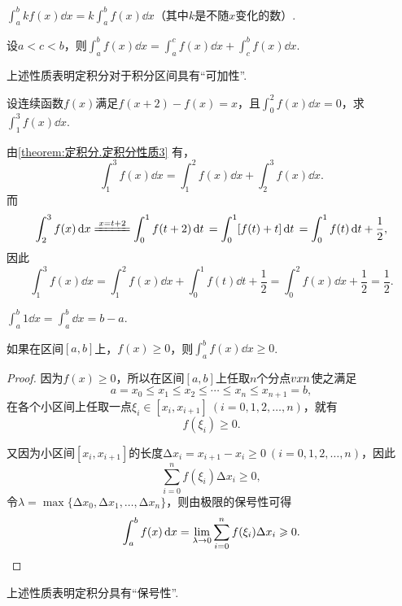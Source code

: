 \begin{property}\label{theorem:定积分.定积分性质2}
\(\int_a^b{kf(x)\dd{x}}=k\int_a^b f(x) \dd{x}\)（其中\(k\)是不随\(x\)变化的数）.
\end{property}

\begin{property}\label{theorem:定积分.定积分性质3}
设\(a < c < b\)，则\(\int_a^b f(x) \dd{x}
= \int_a^c{f(x)\dd{x}} + \int_c^b{f(x)\dd{x}}\).
\end{property}
上述性质表明定积分对于积分区间具有“可加性”.

\begin{example}
设连续函数\(f(x)\)满足\(f(x+2)-f(x)=x\)，且\(\int_0^2 f(x) \dd{x} = 0\)，求\(\int_1^3 f(x) \dd{x}\).
\begin{solution}
由\cref{theorem:定积分.定积分性质3} 有，\[
\int_1^3 f(x) \dd{x}
= \int_1^2 f(x) \dd{x}
+ \int_2^3 f(x) \dd{x}.
\]而\[
\int_2^3 f(x) \dd{x}
\xlongequal{x=t+2} \int_0^1 f(t+2) \dd{t} \\
= \int_0^1 [f(t) + t] \dd{t} \\
= \int_0^1 f(t) \dd{t} + \frac{1}{2},
\]因此\[
\int_1^3 f(x) \dd{x}
= \int_1^2 f(x) \dd{x}
+ \int_0^1 f(t) \dd{t} + \frac{1}{2}
= \int_0^2 f(x) \dd{x} + \frac{1}{2}
= \frac{1}{2}.
\]
\end{solution}
\end{example}

\begin{property}\label{theorem:定积分.定积分性质4}
\(\int_a^b 1 \dd{x} = \int_a^b \dd{x} = b-a\).
\end{property}

\begin{property}\label{theorem:定积分.定积分性质5}
如果在区间\([a,b]\)上，\(f(x) \geqslant 0\)，则\(\int_a^b f(x) \dd{x} \geqslant 0\).
\begin{proof}
因为\(f(x) \geqslant 0\)，所以在区间\([a,b]\)上任取\(n\)个分点\(v{x}{n}\)使之满足\[
a = x_0 \leqslant x_1 \leqslant x_2 \leqslant \dotsb \leqslant x_n \leqslant x_{n+1} = b,
\]在各个小区间上任取一点\(\xi_i\in[x_i,x_{i+1}]\ (i=0,1,2,\dotsc,n)\)，就有\[
f(\xi_i)\geqslant0.
\]

又因为小区间\([x_i,x_{i+1}]\)的长度\(\increment x_i = x_{i+1}-x_i \geqslant 0\ (i=0,1,2,\dotsc,n)\)，因此\[
\sum\limits_{i=0}^n f(\xi_i) \increment x_i \geqslant 0,
\]令\(\lambda = \max\{\increment x_0, \increment x_1, \dotsc, \increment x_n\}\)，则由极限的保号性可得\[
\int_a^b f(x) \dd{x} = \lim\limits_{\lambda\to0} \sum\limits_{i=0}^n f(\xi_i) \Delta x_i \geqslant 0.
\qedhere
\]
\end{proof}
\end{property}
上述性质表明定积分具有“保号性”.

